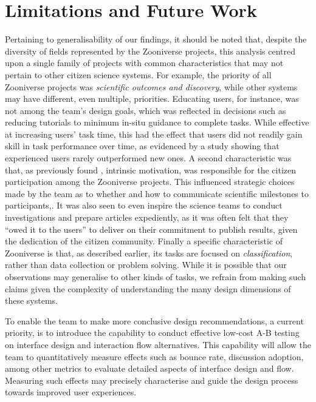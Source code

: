 \documentclass{sigchi}
\begin{document}
\section{Limitations and Future Work}
Pertaining to generalisability of our findings, it should be noted that, despite the diversity of fields represented by the Zooniverse projects, this analysis centred upon a single family of projects with common characteristics that may not pertain to other citizen science systems.  For example, the priority of all Zooniverse projects was \emph{scientific outcomes and discovery}, while other systems may have different, even multiple, priorities. Educating users, for instance, was not among the team's design goals, which was reflected in decisions such as reducing tutorials to minimum in-situ guidance to complete tasks.  While effective at increasing users' task time, this had the effect that users did not readily gain skill in task performance over time, as evidenced by a study showing that experienced users rarely outperformed new ones.  A second characteristic was that, as previously found \cite{raddick2010galaxy}, intrinsic motivation,  was responsible for the citizen participation among the Zooniverse projects.  This influenced strategic choices made by the team as to whether and how to communicate scientific milestones to participants,.  It was also seen to even inspire the science teams to conduct investigations and prepare articles expediently, as it was often felt that they ``owed it to the users'' to deliver on their commitment to publish results, given the dedication of the citizen community.  Finally a specific characteristic of Zooniverse is that, as described earlier, its tasks are focused on \emph{classification}, rather than data collection or problem solving.  While it is possible that our observations may generalise to other kinds of tasks, we refrain from making such claims given the complexity of understanding the many design dimensions of these systems.

To enable the team to make more conclusive design recommendations, a current priority, is to introduce the capability to conduct effective low-cost A-B testing on interface design and interaction flow alternatives.  This capability will allow the team to quantitatively measure effects such as bounce rate, discussion adoption, among other metrics to evaluate detailed aspects of interface design and flow.  Measuring such effects may precisely characterise and guide the design process towards improved user experiences. 
\end{document}
